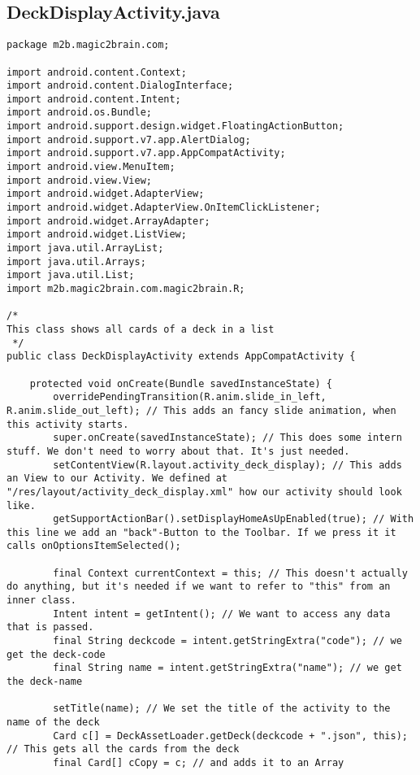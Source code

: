 \subsection*{DeckDisplayActivity.java}
\begin{lstlisting}
package m2b.magic2brain.com;

import android.content.Context;
import android.content.DialogInterface;
import android.content.Intent;
import android.os.Bundle;
import android.support.design.widget.FloatingActionButton;
import android.support.v7.app.AlertDialog;
import android.support.v7.app.AppCompatActivity;
import android.view.MenuItem;
import android.view.View;
import android.widget.AdapterView;
import android.widget.AdapterView.OnItemClickListener;
import android.widget.ArrayAdapter;
import android.widget.ListView;
import java.util.ArrayList;
import java.util.Arrays;
import java.util.List;
import m2b.magic2brain.com.magic2brain.R;

/*
This class shows all cards of a deck in a list
 */
public class DeckDisplayActivity extends AppCompatActivity {

    protected void onCreate(Bundle savedInstanceState) {
        overridePendingTransition(R.anim.slide_in_left, R.anim.slide_out_left); // This adds an fancy slide animation, when this activity starts.
        super.onCreate(savedInstanceState); // This does some intern stuff. We don't need to worry about that. It's just needed.
        setContentView(R.layout.activity_deck_display); // This adds an View to our Activity. We defined at "/res/layout/activity_deck_display.xml" how our activity should look like.
        getSupportActionBar().setDisplayHomeAsUpEnabled(true); // With this line we add an "back"-Button to the Toolbar. If we press it it calls onOptionsItemSelected();

        final Context currentContext = this; // This doesn't actually do anything, but it's needed if we want to refer to "this" from an inner class.
        Intent intent = getIntent(); // We want to access any data that is passed.
        final String deckcode = intent.getStringExtra("code"); // we get the deck-code
        final String name = intent.getStringExtra("name"); // we get the deck-name

        setTitle(name); // We set the title of the activity to the name of the deck
        Card c[] = DeckAssetLoader.getDeck(deckcode + ".json", this); // This gets all the cards from the deck
        final Card[] cCopy = c; // and adds it to an Array


\end{lstlisting}
